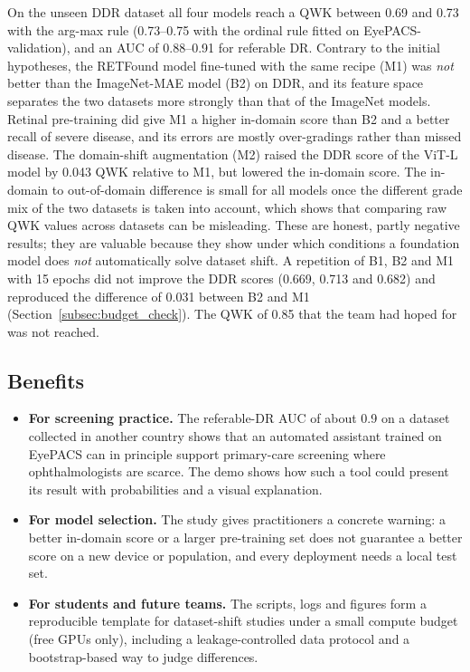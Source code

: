 On the unseen DDR dataset all four models reach a QWK between 0.69 and 0.73 with the arg-max rule (0.73--0.75 with the ordinal rule fitted on EyePACS-validation), and an AUC of 0.88--0.91 for referable DR. Contrary to the initial hypotheses, the RETFound model fine-tuned with the same recipe (M1) was \emph{not} better than the ImageNet-MAE model (B2) on DDR, and its feature space separates the two datasets more strongly than that of the ImageNet models. Retinal pre-training did give M1 a higher in-domain score than B2 and a better recall of severe disease, and its errors are mostly over-gradings rather than missed disease. The domain-shift augmentation (M2) raised the DDR score of the ViT-L model by 0.043 QWK relative to M1, but lowered the in-domain score. The in-domain to out-of-domain difference is small for all models once the different grade mix of the two datasets is taken into account, which shows that comparing raw QWK values across datasets can be misleading. These are honest, partly negative results; they are valuable because they show under which conditions a foundation model does \emph{not} automatically solve dataset shift.
A repetition of B1, B2 and M1 with 15 epochs did not improve the DDR scores (0.669, 0.713 and 0.682) and reproduced the difference of 0.031 between B2 and M1 (Section~\ref{subsec:budget_check}). The QWK of 0.85 that the team had hoped for was not reached.

\subsection{Benefits}
\label{subsec:benefits}

\begin{itemize}[leftmargin=1.5em]
    \item \textbf{For screening practice.} The referable-DR AUC of about 0.9 on a dataset collected in another country shows that an automated assistant trained on EyePACS can in principle support primary-care screening where ophthalmologists are scarce. The demo shows how such a tool could present its result with probabilities and a visual explanation.
    \item \textbf{For model selection.} The study gives practitioners a concrete warning: a better in-domain score or a larger pre-training set does not guarantee a better score on a new device or population, and every deployment needs a local test set.
    \item \textbf{For students and future teams.} The scripts, logs and figures form a reproducible template for dataset-shift studies under a small compute budget (free GPUs only), including a leakage-controlled data protocol and a bootstrap-based way to judge differences.
\end{itemize}


